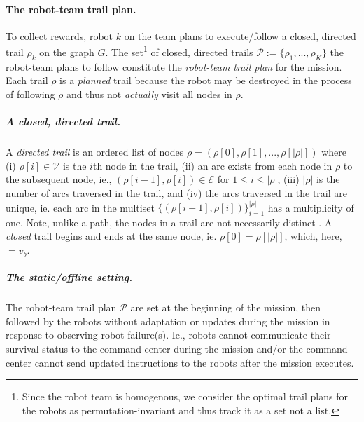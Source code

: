 \documentclass[11pt, oneside]{article}
\begin{document}
\paragraph{The robot-team trail plan.}
To collect rewards, robot $k$ on the team plans to execute/follow a closed, directed trail $\rho_k$ on the graph $G$.  
The set\footnote{Since the robot team is homogenous, we consider the optimal trail plans for the robots as permutation-invariant and thus track it as a set not a list.} of closed, directed trails $\mathcal{P}:=\{\rho_1, ..., \rho_K\}$ the robot-team plans to follow constitute the \emph{robot-team trail plan} for the mission. 
Each trail $\rho$ is a \emph{planned} trail because the robot may be destroyed in the process of following $\rho$ and thus not \emph{actually} visit all nodes in $\rho$.

\vspace{-\baselineskip}
\subparagraph{A closed, directed trail.} 
A \emph{directed trail} is an ordered list of nodes $\rho = (\rho[0], \rho[1], ..., \rho[\lvert \rho \rvert])$ where
(i) $\rho[i] \in \mathcal{V}$ is the $i$th node in the trail,  
(ii) an arc exists from each node in $\rho$ to the subsequent node, ie., $(\rho[i-1], \rho[i])\in\mathcal{E}$ for $1 \leq i  \leq \lvert \rho \rvert$,
(iii) $\lvert \rho \rvert$ is the number of arcs traversed in the trail,
and
(iv) the arcs traversed in the trail are unique, ie. each arc in the multiset $\{(\rho[i-1], \rho[i])\}_{i=1}^{\lvert \rho \rvert}$ has a multiplicity of one.
Note, unlike a path, the nodes in a trail are not necessarily distinct \cite{wilson1979introduction}.
A \emph{closed} trail begins and ends at the same node, ie. $\rho [0]=\rho[\lvert \rho \rvert]$, which, here, $=v_b$.

\vspace{-\baselineskip}
\subparagraph{The static/offline setting.} 
The robot-team trail plan $\mathcal{P}$ are set at the beginning of the mission, then followed by the robots without adaptation or updates during the mission in response to observing robot failure(s).
Ie., robots cannot communicate their survival status to the command center during the mission and/or the command center cannot send updated instructions to the robots after the mission executes.
\end{document}
